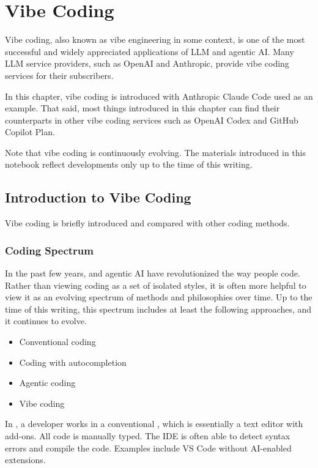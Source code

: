 \chapter{Vibe Coding} 

Vibe coding, also known as vibe engineering in some context, is one of the most successful and widely appreciated applications of LLM and agentic AI. Many LLM service providers, such as OpenAI and Anthropic, provide vibe coding services for their subscribers. 

In this chapter, vibe coding is introduced with Anthropic Claude Code used as an example. That said, most things introduced in this chapter can find their counterparts in other vibe coding services such as OpenAI Codex and GitHub Copilot Plan.

Note that vibe coding is continuously evolving. The materials introduced in this notebook reflect developments only up to the time of this writing.

\section{Introduction to Vibe Coding}

Vibe coding is briefly introduced and compared with other coding methods.

\subsection{Coding Spectrum}

In the past few years,  and agentic AI have revolutionized the way people code. Rather than viewing coding as a set of isolated styles, it is often more helpful to view it as an evolving spectrum of methods and philosophies over time. Up to the time of this writing, this spectrum includes at least the following approaches, and it continues to evolve.

\begin{itemize}
  \item Conventional coding
  \item Coding with autocompletion
  \item Agentic coding
  \item Vibe coding
\end{itemize}

In , a developer works in a conventional , which is essentially a text editor with add-ons. All code is manually typed. The IDE is often able to detect syntax errors and compile the code. Examples include VS Code without AI-enabled extensions.


